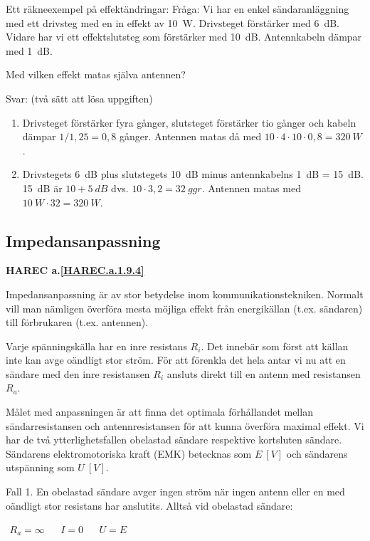 Ett räkneexempel på effektändringar:
Fråga:
Vi har en enkel sändaranläggning med ett drivsteg med en in effekt av 10~W.
Drivsteget förstärker med 6~dB. Vidare har vi ett effektslutsteg som förstärker
med 10~dB. Antennkabeln dämpar med 1~dB.

Med vilken effekt matas själva antennen?

Svar: (två sätt att lösa uppgiften)
\begin{enumerate}
\item Drivsteget förstärker fyra gånger, slutsteget förstärker tio gånger och
kabeln dämpar \(1/1,25 = 0,8\) gånger. Antennen matas då med
\(10 \cdot 4 \cdot 10 \cdot 0,8 = 320\ W\).
\item Drivstegets 6~dB plus slutstegets 10~dB minus antennkabelns 1~dB = 15~dB.
15~dB är \(10 + 5\ dB\) dvs. \(10 \cdot 3,2 = 32\ ggr\). Antennen matas med
\(10\ W \cdot 32 = 320\ W\).
\end{enumerate}

\subsection{Impedansanpassning}
\textbf{HAREC a.\ref{HAREC.a.1.9.4}\label{myHAREC.a.1.9.4}}

Impedansanpassning är av stor betydelse inom kommunikationstekniken.
Normalt vill man nämligen överföra mesta möjliga effekt från energikällan
(t.ex. sändaren) till förbrukaren (t.ex. antennen).

Varje spänningskälla har en inre resistans \(R_i\). Det innebär som först att
källan inte kan avge oändligt stor ström.
För att förenkla det hela antar vi nu att en sändare med den inre resistansen
\(R_i\) ansluts direkt till en antenn med resistansen \(R_a\).

Målet med anpassningen är att finna det optimala förhållandet mellan
sändarresistansen och antennresistansen för att kunna överföra maximal effekt.
Vi har de två ytterlighetsfallen obelastad sändare respektive kortsluten
sändare. Sändarens elektromotoriska kraft (EMK) betecknas som \(E\ [V]\) och
sändarens utspänning som \(U\ [V]\).

Fall 1.
En obelastad sändare avger ingen ström när ingen antenn eller en med oändligt
stor resistans har anslutits.
Alltså vid obelastad sändare:

\(
\begin{array}{lllll}
R_a = \infty & & I = 0 & & U = E
\end{array}
\)

